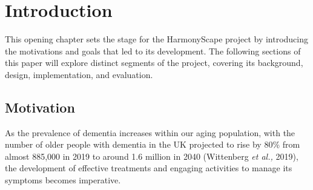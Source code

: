\documentclass{l4proj}
\begin{document}
\tableofcontents

%
%
%
%
%
%
%
%
\chapter{Introduction}


This opening chapter sets the stage for the HarmonyScape project by introducing the motivations and goals that led to its development. The following sections of this paper will explore distinct segments of the project, covering its background, design, implementation, and evaluation.

\section{Motivation}

As the prevalence of dementia increases within our aging population, with the number of older people with dementia in the UK projected to rise by 80\% from almost 885,000 in 2019 to around 1.6 million in 2040 (Wittenberg \emph{et al.,} 2019), the development of effective treatments and engaging activities to manage its symptoms becomes imperative.
\end{document}
